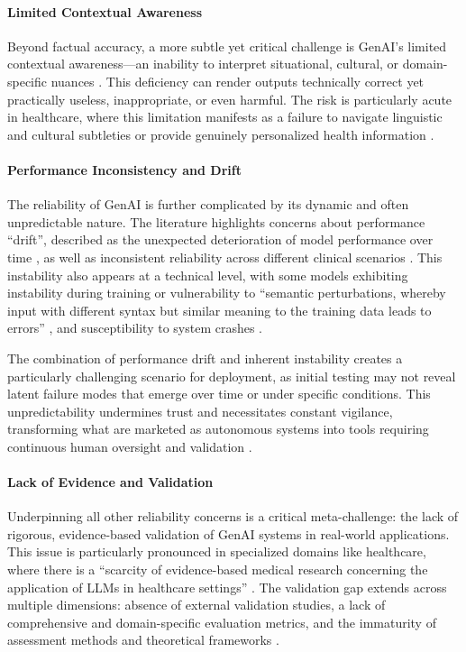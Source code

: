 \paragraph{Limited Contextual Awareness}
Beyond factual accuracy, a more subtle yet critical challenge is GenAI's limited contextual awareness—an inability to interpret situational, cultural, or domain-specific nuances \parencite{S01, R04, R05, S07, S09, S11}. This deficiency can render outputs technically correct yet practically useless, inappropriate, or even harmful. The risk is particularly acute in healthcare, where this limitation manifests as a failure to navigate linguistic and cultural subtleties \parencite{S01} or provide genuinely personalized health information \parencite{S11}.

\paragraph{Performance Inconsistency and Drift}
The reliability of GenAI is further complicated by its dynamic and often unpredictable nature. The literature highlights concerns about performance ``drift'', described as the unexpected deterioration of model performance over time \parencite{R04}, as well as inconsistent reliability across different clinical scenarios \parencite{S05}. This instability also appears at a technical level, with some models exhibiting instability during training \parencite{S07} or vulnerability to \enquote{semantic perturbations, whereby input with different syntax but similar meaning to the training data leads to errors} \parencite{S09}, and susceptibility to system crashes \parencite{S11}.

The combination of performance drift and inherent instability creates a particularly challenging scenario for deployment, as initial testing may not reveal latent failure modes that emerge over time or under specific conditions. This unpredictability undermines trust and necessitates constant vigilance, transforming what are marketed as autonomous systems into tools requiring continuous human oversight and validation \parencite{R04}.

\paragraph{Lack of Evidence and Validation}
Underpinning all other reliability concerns is a critical meta-challenge: the lack of rigorous, evidence-based validation of GenAI systems in real-world applications. This issue is particularly pronounced in specialized domains like healthcare, where there is a \enquote{scarcity of evidence-based medical research concerning the application of LLMs in healthcare settings} \parencite{S01}. The validation gap extends across multiple dimensions: absence of external validation studies, a lack of comprehensive and domain-specific evaluation metrics, and the immaturity of assessment methods and theoretical frameworks \parencite{S01, S07, S08, S18}.

